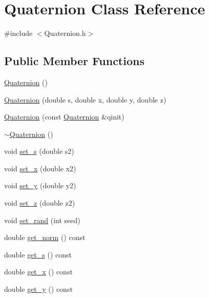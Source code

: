 \hypertarget{class_quaternion}{}\section{Quaternion Class Reference}
\label{class_quaternion}


{\ttfamily \#include $<$Quaternion.\+h$>$}

\subsection*{Public Member Functions}
\begin{DoxyCompactItemize}
\item 
\mbox{\hyperlink{class_quaternion_abcc01358aada56ea5f0db4da18aaf77d}{Quaternion}} ()
\item 
\mbox{\hyperlink{class_quaternion_acfe8dedd6463d94520dc654f4879efcc}{Quaternion}} (double s, double x, double y, double z)
\item 
\mbox{\hyperlink{class_quaternion_ad4662fcc6d9f27298e6020f7fbf715b5}{Quaternion}} (const \mbox{\hyperlink{class_quaternion}{Quaternion}} \&qinit)
\item 
\mbox{\hyperlink{class_quaternion_a5f834c2ca469cd71edc8a23fdc3f56e8}{$\sim$\+Quaternion}} ()
\item 
void \mbox{\hyperlink{class_quaternion_a21bf0e35dfb1616fe519699d7182a22c}{set\+\_\+s}} (double s2)
\item 
void \mbox{\hyperlink{class_quaternion_ac3e8b4157202187c4b219a828490af52}{set\+\_\+x}} (double x2)
\item 
void \mbox{\hyperlink{class_quaternion_ad1e20cfd1c7ac6eeff342d85e071e35f}{set\+\_\+y}} (double y2)
\item 
void \mbox{\hyperlink{class_quaternion_a5a799468a4c8d0ea6f4ddcdbb25ce65b}{set\+\_\+z}} (double z2)
\item 
void \mbox{\hyperlink{class_quaternion_a213bd44408007e328bb3bc8b5ccbbc78}{set\+\_\+rand}} (int seed)
\item 
double \mbox{\hyperlink{class_quaternion_a09a489ba1d33f53cb92b88d6ca2880c4}{get\+\_\+norm}} () const
\item 
double \mbox{\hyperlink{class_quaternion_a086532bcfc22518e3d95eb0f3463a898}{get\+\_\+s}} () const
\item 
double \mbox{\hyperlink{class_quaternion_abbce3f8d66aa2740e4c5f7beccbe2339}{get\+\_\+x}} () const
\item 
double \mbox{\hyperlink{class_quaternion_a9616aee2dd03b502f1fcd98b0a1fd48e}{get\+\_\+y}} () const

\end{DoxyCompactItemize}
